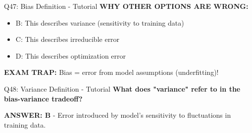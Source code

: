 \documentclass[8pt]{beamer}
\begin{document}
\begin{frame}{Q47: Bias Definition - Tutorial}
		\vspace{0.05cm}
		\textcolor{myred}{\textbf{WHY OTHER OPTIONS ARE WRONG:}}
		\begin{itemize}
			\item \textcolor{myred}{B:} This describes variance (sensitivity to training data)
			\item \textcolor{myred}{C:} This describes irreducible error
			\item \textcolor{myred}{D:} This describes optimization error
		\end{itemize}
		
		\textcolor{myred}{\textbf{EXAM TRAP:}} Bias = error from model assumptions (underfitting)!
	\end{frame}
	
	\begin{frame}{Q48: Variance Definition - Tutorial}
		\fontsize{6.5}{7.5}\selectfont
		\textbf{What does "variance" refer to in the bias-variance tradeoff?}
		
		\vspace{0.05cm}
		\textcolor{myblue}{\textbf{ANSWER: B}} - Error introduced by model's sensitivity to fluctuations in training data.
		

\end{frame}
\end{document}
